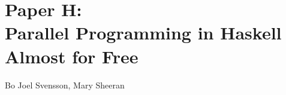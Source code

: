 \documentclass[a4paper]{book}
\newcommand{\paperH}{Paper H}
\newcommand{\paperHTitle}{Parallel Programming in Haskell Almost for Free}
\begin{document}
% 
\cleardoublepage 


\section[\paperHTitle]{\paperH: \\ \paperHTitle}
\label{sec:paperH}


\begin{center} 
Bo Joel Svensson, Mary Sheeran
\end{center}





\cleardoublepage


\nocite{*}



\makeatletter
\renewenvironment{thebibliography}[1]
     {\chapter*{\bibname}%
      \@mkboth{\MakeUppercase\bibname}{\MakeUppercase\bibname}%
      \list{\@biblabel{\@arabic\c@enumiv}}%
           {\settowidth\labelwidth{\@biblabel{#1}}%
            \leftmargin\labelwidth
            \advance\leftmargin\labelsep
            \@openbib@code
            \usecounter{enumiv}%
            \let\p@enumiv\@empty
            \renewcommand\theenumiv{\@arabic\c@enumiv}}%
      \sloppy
      \clubpenalty4000
      \@clubpenalty \clubpenalty
      \widowpenalty4000%
      \sfcode`\.\@m}
     {\def\@noitemerr
       {\@latex@warning{Empty `thebibliography' environment}}%
       \endlist}
\makeatother



\end{document}
